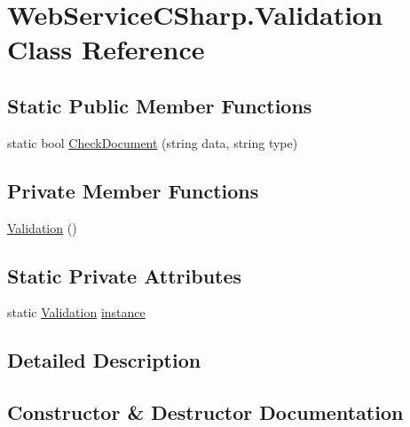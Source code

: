\hypertarget{class_web_service_c_sharp_1_1_validation}{}\section{Web\+Service\+C\+Sharp.\+Validation Class Reference}
\label{class_web_service_c_sharp_1_1_validation}


 


\subsection*{Static Public Member Functions}
\begin{DoxyCompactItemize}
\item 
static bool \hyperlink{class_web_service_c_sharp_1_1_validation_a72623f32aba4af35d81c2ffa93be309b}{Check\+Document} (string data, string type)
\end{DoxyCompactItemize}
\subsection*{Private Member Functions}
\begin{DoxyCompactItemize}
\item 
\hyperlink{class_web_service_c_sharp_1_1_validation_a4234d31fa043b91b46ea77900b7b0706}{Validation} ()
\end{DoxyCompactItemize}
\subsection*{Static Private Attributes}
\begin{DoxyCompactItemize}
\item 
static \hyperlink{class_web_service_c_sharp_1_1_validation}{Validation} \hyperlink{class_web_service_c_sharp_1_1_validation_a93b32257a86fabe924c10f1b3bbefe18}{instance}
\end{DoxyCompactItemize}


\subsection{Detailed Description}




\subsection{Constructor \& Destructor Documentation}
\mbox{\label{class_web_service_c_sharp_1_1_validation_a4234d31fa043b91b46ea77900b7b0706}} 
